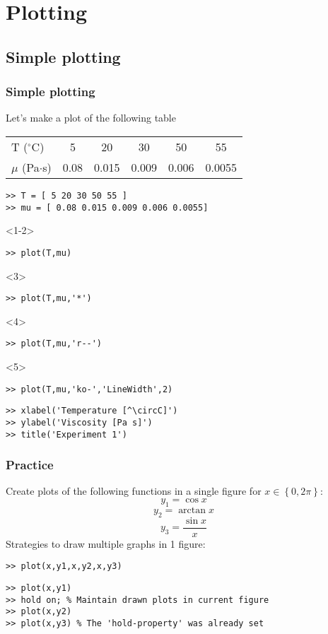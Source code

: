 \section{Plotting}
\subsection*{Simple plotting}
\begin{frame}[fragile]
  \frametitle{Simple plotting}
  Let's make a plot of the following table
   \begin{longtable}{l!{\vrule}ccccc}
      T ($^\circ$C) & 5   &  20  & 30   & 50   & 55 \\
      $\mu$ (Pa$\cdot$s)  & 0.08& 0.015& 0.009& 0.006& 0.0055 \\
    \end{longtable} \pause
  \begin{lstlisting}
>> T = [ 5 20 30 50 55 ]
>> mu = [ 0.08 0.015 0.009 0.006 0.0055]
\end{lstlisting}
\begin{onlyenv}<1-2>
  \begin{lstlisting}
>> plot(T,mu)
  \end{lstlisting}
\end{onlyenv}
\begin{onlyenv}<3>
  \begin{lstlisting}
>> plot(T,mu,'*')
  \end{lstlisting}
\end{onlyenv}
\begin{onlyenv}<4>
  \begin{lstlisting}
>> plot(T,mu,'r--')
  \end{lstlisting}
\end{onlyenv}
\begin{onlyenv}<5>
  \begin{lstlisting}
>> plot(T,mu,'ko-','LineWidth',2)
  \end{lstlisting}
\end{onlyenv}
\begin{lstlisting}
>> xlabel('Temperature [^\circC]')
>> ylabel('Viscosity [Pa s]')
>> title('Experiment 1')
  \end{lstlisting}
\end{frame}

\begin{frame}[fragile]
 \frametitle{Practice}
 Create plots of the following functions in a single figure for $x \in \left\{0,2\pi\right\}$:
  \[
    y_1 = \cos x 
  \]
  \[
    y_2 = \arctan x 
  \]
  \[
    y_3 = \frac{\sin x }{x}
  \]
  \pause
  Strategies to draw multiple graphs in 1 figure:
 \begin{lstlisting}
>> plot(x,y1,x,y2,x,y3)
 \end{lstlisting}
  \begin{lstlisting}
>> plot(x,y1)
>> hold on; % Maintain drawn plots in current figure
>> plot(x,y2)
>> plot(x,y3) % The 'hold-property' was already set
  \end{lstlisting}
\end{frame}

